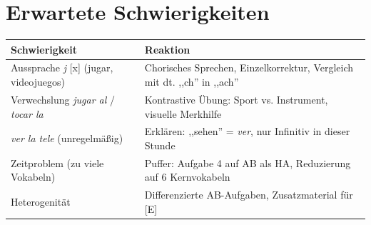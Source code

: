 \documentclass[11pt,a4paper]{article}
\begin{document}
\begin{center}
\end{center}

\section{Erwartete Schwierigkeiten}

\begin{tabular}{|p{5cm}|p{8cm}|}
\hline
\textbf{Schwierigkeit} & \textbf{Reaktion} \\
\hline
Aussprache \textit{j} [x] (jugar, videojuegos) & Chorisches Sprechen, Einzelkorrektur, Vergleich mit dt. ,,ch'' in ,,ach'' \\
\hline
Verwechslung \textit{jugar al} / \textit{tocar la} & Kontrastive Übung: Sport vs. Instrument, visuelle Merkhilfe \\
\hline
\textit{ver la tele} (unregelmäßig) & Erklären: ,,sehen'' = \textit{ver}, nur Infinitiv in dieser Stunde \\
\hline
Zeitproblem (zu viele Vokabeln) & Puffer: Aufgabe 4 auf AB als HA, Reduzierung auf 6 Kernvokabeln \\
\hline
Heterogenität & Differenzierte AB-Aufgaben, Zusatzmaterial für [E] \\
\hline
\end{tabular}
\end{document}
